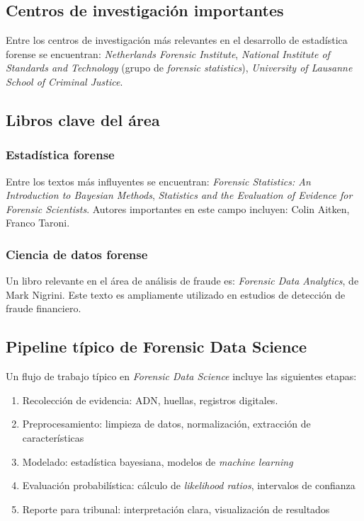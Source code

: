 \documentclass[a4paper,10pt,oneside]{article}
\begin{document}
\subsection{Centros de investigaci\'on importantes}

Entre los centros de investigaci\'on m\'as relevantes en el desarrollo de estad\'istica forense se encuentran: \textit{Netherlands Forensic Institute}, \textit{National Institute of Standards and Technology} (grupo de \textit{forensic statistics}),  \textit{University of Lausanne School of Criminal Justice}.

\subsection{Libros clave del \'area}

\subsubsection*{Estad\'istica forense}

Entre los textos m\'as influyentes se encuentran: \textit{Forensic Statistics: An Introduction to Bayesian Methods}, \textit{Statistics and the Evaluation of Evidence for Forensic Scientists}. Autores importantes en este campo incluyen: Colin Aitken, Franco Taroni.

\subsubsection*{Ciencia de datos forense}

Un libro relevante en el \'area de an\'alisis de fraude es: \textit{Forensic Data Analytics}, de Mark Nigrini. Este texto es ampliamente utilizado en estudios de detecci\'on de fraude financiero.

\subsection{Pipeline t\'ipico de Forensic Data Science}

Un flujo de trabajo t\'ipico en \textit{Forensic Data Science} incluye las siguientes etapas:

\begin{enumerate}
\item Recolecci\'on de evidencia: ADN,  huellas, registros digitales.
\item Preprocesamiento: limpieza de datos, normalizaci\'on, extracci\'on de caracter\'isticas
\item Modelado: estad\'istica bayesiana, modelos de \textit{machine learning}
\item Evaluaci\'on probabil\'istica: c\'alculo de \textit{likelihood ratios}, intervalos de confianza
\item Reporte para tribunal: interpretaci\'on clara,  visualizaci\'on de resultados


\end{enumerate}
\end{document}
